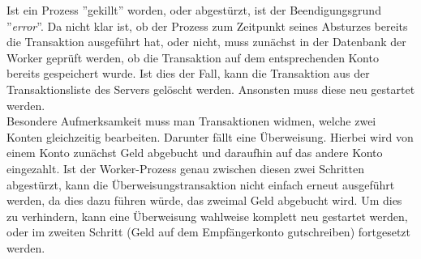 Ist ein Prozess ''gekillt'' worden, oder abgestürzt, ist der Beendigungsgrund ''\textit{error}''. Da nicht klar ist, ob der Prozess zum Zeitpunkt seines Absturzes bereits die Transaktion ausgeführt hat, oder nicht, muss zunächst in der Datenbank der Worker geprüft werden, ob die Transaktion auf dem entsprechenden Konto bereits gespeichert wurde. Ist dies der Fall, kann die Transaktion aus der Transaktionsliste des Servers gelöscht werden. Ansonsten muss diese neu gestartet werden.\\
Besondere Aufmerksamkeit muss man Transaktionen widmen, welche zwei Konten gleichzeitig bearbeiten. Darunter fällt eine Überweisung. Hierbei wird von einem Konto zunächst Geld abgebucht und daraufhin auf das andere Konto eingezahlt. Ist der Worker-Prozess genau zwischen diesen zwei Schritten abgestürzt, kann die Überweisungstransaktion nicht einfach erneut ausgeführt werden, da dies dazu führen würde, das zweimal Geld abgebucht wird. Um dies zu verhindern, kann eine Überweisung wahlweise komplett neu gestartet werden, oder im zweiten Schritt (Geld auf dem Empfängerkonto gutschreiben) fortgesetzt werden.